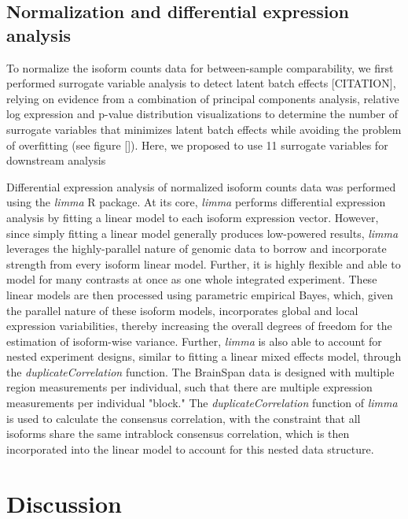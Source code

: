 \subsection{Normalization and differential expression analysis}
To normalize the isoform counts data for between-sample comparability, we first performed surrogate variable analysis to detect latent batch effects [CITATION], relying on evidence from a combination of principal components analysis, relative log expression and p-value distribution visualizations to determine the number of surrogate variables that minimizes latent batch effects while avoiding the problem of overfitting (see figure []). Here, we proposed to use 11 surrogate variables for downstream analysis\par
Differential expression analysis of normalized isoform counts data was performed using the \textit{limma} R package. At its core, \textit{limma} performs differential expression analysis by fitting a linear model to each isoform expression vector. However, since simply fitting a linear model generally produces low-powered results, \textit{limma} leverages the highly-parallel nature of genomic data to borrow and incorporate strength from every isoform linear model. Further, it is highly flexible and able to model for many contrasts at once as one whole integrated experiment. These linear models are then processed using parametric empirical Bayes, which, given the parallel nature of these isoform models, incorporates global and local expression variabilities, thereby increasing the overall degrees of freedom for the estimation of isoform-wise variance. Further, \textit{limma} is also able to account for nested experiment designs, similar to fitting a linear mixed effects model, through the \textit{duplicateCorrelation} function. The BrainSpan data is designed with multiple region measurements per individual, such that there are multiple expression measurements per individual "block." The \textit{duplicateCorrelation} function of \textit{limma} is used to calculate the consensus correlation, with the constraint that all isoforms share the same intrablock consensus correlation, which is then incorporated into the linear model to account for this nested data structure. 
\section{Discussion}